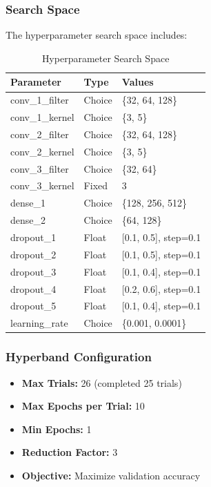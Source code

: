 \documentclass[12pt,a4paper]{article}
\begin{document}
\subsubsection{Search Space}
The hyperparameter search space includes:

\begin{table}[H]
\centering
\caption{Hyperparameter Search Space}
\begin{tabular}{lll}
\toprule
\textbf{Parameter} & \textbf{Type} & \textbf{Values} \\
\midrule
conv\_1\_filter & Choice & \{32, 64, 128\} \\
conv\_1\_kernel & Choice & \{3, 5\} \\
conv\_2\_filter & Choice & \{32, 64, 128\} \\
conv\_2\_kernel & Choice & \{3, 5\} \\
conv\_3\_filter & Choice & \{32, 64\} \\
conv\_3\_kernel & Fixed & 3 \\
dense\_1 & Choice & \{128, 256, 512\} \\
dense\_2 & Choice & \{64, 128\} \\
dropout\_1 & Float & [0.1, 0.5], step=0.1 \\
dropout\_2 & Float & [0.1, 0.5], step=0.1 \\
dropout\_3 & Float & [0.1, 0.4], step=0.1 \\
dropout\_4 & Float & [0.2, 0.6], step=0.1 \\
dropout\_5 & Float & [0.1, 0.4], step=0.1 \\
learning\_rate & Choice & \{0.001, 0.0001\} \\
\bottomrule
\end{tabular}
\end{table}

\subsubsection{Hyperband Configuration}
\begin{itemize}
    \item \textbf{Max Trials:} 26 (completed 25 trials)
    \item \textbf{Max Epochs per Trial:} 10
    \item \textbf{Min Epochs:} 1
    \item \textbf{Reduction Factor:} 3
    \item \textbf{Objective:} Maximize validation accuracy
\end{itemize}
\end{document}
